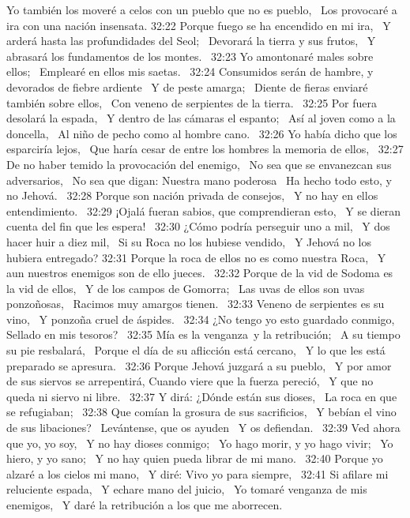 Yo también los moveré a celos con un pueblo que no es pueblo,  
Los provocaré a ira con una nación insensata. 
32:22 Porque fuego se ha encendido en mi ira,  
Y arderá hasta las profundidades del Seol;  
Devorará la tierra y sus frutos,  
Y abrasará los fundamentos de los montes.  
32:23 Yo amontonaré males sobre ellos;  
Emplearé en ellos mis saetas.  
32:24 Consumidos serán de hambre, y devorados de fiebre ardiente  
Y de peste amarga;  
Diente de fieras enviaré también sobre ellos,  
Con veneno de serpientes de la tierra.  
32:25 Por fuera desolará la espada,  
Y dentro de las cámaras el espanto;  
Así al joven como a la doncella,  
Al niño de pecho como al hombre cano.  
32:26 Yo había dicho que los esparciría lejos,  
Que haría cesar de entre los hombres la memoria de ellos,  
32:27 De no haber temido la provocación del enemigo,  
No sea que se envanezcan sus adversarios,  
No sea que digan: Nuestra mano poderosa  
Ha hecho todo esto, y no Jehová.  
32:28 Porque son nación privada de consejos,  
Y no hay en ellos entendimiento.  
32:29 ¡Ojalá fueran sabios, que comprendieran esto,  
Y se dieran cuenta del fin que les espera!  
32:30 ¿Cómo podría perseguir uno a mil,  
Y dos hacer huir a diez mil,  
Si su Roca no los hubiese vendido,  
Y Jehová no los hubiera entregado? 
32:31 Porque la roca de ellos no es como nuestra Roca,  
Y aun nuestros enemigos son de ello jueces.  
32:32 Porque de la vid de Sodoma es la vid de ellos,  
Y de los campos de Gomorra;  
Las uvas de ellos son uvas ponzoñosas,  
Racimos muy amargos tienen.  
32:33 Veneno de serpientes es su vino,  
Y ponzoña cruel de áspides.  
32:34 ¿No tengo yo esto guardado conmigo,  
Sellado en mis tesoros?  
32:35 Mía es la venganza y la retribución;  
A su tiempo su pie resbalará,  
Porque el día de su aflicción está cercano,  
Y lo que les está preparado se apresura.  
32:36 Porque Jehová juzgará a su pueblo,  
Y por amor de sus siervos se arrepentirá, 
Cuando viere que la fuerza pereció,  
Y que no queda ni siervo ni libre.  
32:37 Y dirá: ¿Dónde están sus dioses,  
La roca en que se refugiaban;  
32:38 Que comían la grosura de sus sacrificios,  
Y bebían el vino de sus libaciones?  
Levántense, que os ayuden  
Y os defiendan.  
32:39 Ved ahora que yo, yo soy,  
Y no hay dioses conmigo;  
Yo hago morir, y yo hago vivir;  
Yo hiero, y yo sano;  
Y no hay quien pueda librar de mi mano.  
32:40 Porque yo alzaré a los cielos mi mano,  
Y diré: Vivo yo para siempre,  
32:41 Si afilare mi reluciente espada,  
Y echare mano del juicio,  
Yo tomaré venganza de mis enemigos,  
Y daré la retribución a los que me aborrecen. 
